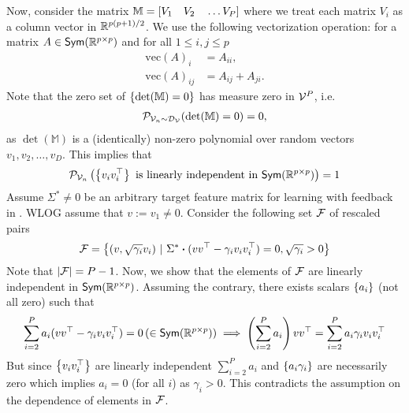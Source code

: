     Now, consider the matrix $\mathbb{M} = \left[ V_1 \quad V_2 \quad \ldots V_P\right]$
where we treat each matrix $V_i$ as a column vector in $\mathbb{R}^{p(p+1)/2}$. We use the following vectorization operation: for a matrix $A \in \textsf{Sym}(\mathbb{R}^{p\times p})$ and for all $1 \le i,j \le p$
\begin{align*}
    \text{vec}(A)_i &= A_{ii}, \\
    \text{vec}(A)_{ij} &= A_{ij} + A_{ji}.
\end{align*}
Note that the zero set of $\left\{\det(\mathbb{M}) = 0\right\}$ has measure zero in ${\mathcal{V}}^P$, i.e.
\begin{align*}
    {\mathcal{P}}_{{\mathcal{V}}_n \sim {\mathcal{D}}_{{\mathcal{V}}}}(\det(\mathbb{M}) = 0) = 0,
\end{align*}
as $\det(\mathbb{M})$ is a (identically) non-zero polynomial over random vectors $v_1,v_2,\ldots, v_{D}$. This implies that
\begin{align}
    {\mathcal{P}}_{{\mathcal{V}}_n} \left( {\left\{v_iv_i^{\top}\right\} \textnormal{ is linearly independent in } \textsf{Sym}(\mathbb{R}^{p\times p})} \right)  = 1 \label{eq: fullprob}
\end{align}
Assume $\Sigma^* \neq 0$ be an arbitrary target feature matrix for learning with feedback in . WLOG assume that $v := v_1 \neq 0$. Consider the following set ${\mathcal{F}}$ of rescaled pairs
\begin{align*}
    {\mathcal{F}} = \left\{(v, \sqrt{\gamma_{i}}v_i)\,\, |\,\, \Sigma^* \boldsymbol{\cdot} (vv^{\top} - \gamma_{i}v_iv_i^{\top}) = 0, \sqrt{\gamma_{i}} > 0\right\}
\end{align*}
Note that $|{\mathcal{F}}| = P - 1$. Now, we show that the elements of ${\mathcal{F}}$ are linearly independent in $\textsf{Sym}(\mathbb{R}^{p\times p})$. Assuming the contrary, there exists scalars $\left\{a_i\right\}$ (not all zero) such that
\begin{align*}
    \sum_{i = 2}^P a_i (vv^{\top} - \gamma_{i}v_iv_i^{\top}) = 0 \,(\in \textsf{Sym}(\mathbb{R}^{p\times p})) 
    \implies  \left( {\sum_{i = 2}^P a_i} \right)  vv^{\top} = \sum_{i = 2}^P a_i \gamma_{i}v_iv_i^{\top}
\end{align*}
But since $\left\{v_iv_i^{\top}\right\}$ are linearly independent $\sum_{i = 2}^P a_i$ and $\left\{a_i\gamma_i\right\}$ are necessarily zero which implies $a_i = 0$ (for all $i$) as $\gamma_{i} > 0$. This contradicts the assumption on the dependence of elements in ${\mathcal{F}}$. 

